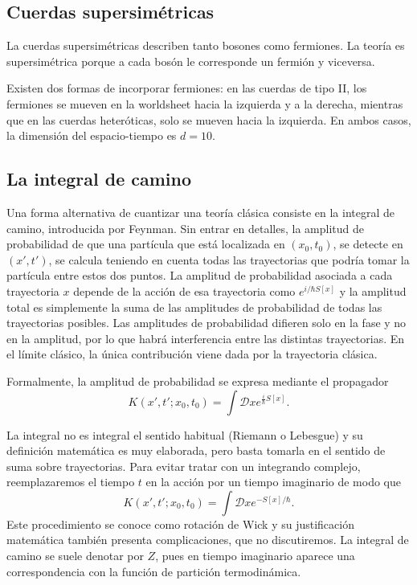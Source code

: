 \subsection{Cuerdas supersimétricas}

La cuerdas supersimétricas describen tanto bosones como fermiones.
La teoría es supersimétrica porque a cada bosón le corresponde un fermión y viceversa.

Existen dos formas de incorporar fermiones:
en las cuerdas de tipo II, los fermiones se mueven en la worldsheet hacia la izquierda y a la derecha,
mientras que en las cuerdas heteróticas, solo se mueven hacia la izquierda.
En ambos casos, la dimensión del espacio-tiempo es $d=10$.


\subsection{La integral de camino}

Una forma alternativa de cuantizar una teoría clásica consiste en la integral de camino, 
introducida por Feynman. 
Sin entrar en detalles, la amplitud de probabilidad de que una partícula que está localizada 
en $(x_0,t_0)$, se detecte en $(x',t')$, se calcula teniendo en cuenta todas las trayectorias
que podría tomar la partícula entre estos dos puntos.
La amplitud de probabilidad asociada a cada trayectoria $x$ depende de la acción de esa trayectoria
como $e^{i/\hbar S[x]}$ y la amplitud total es simplemente la suma de las amplitudes de probabilidad
de todas las trayectorias posibles.
Las amplitudes de probabilidad difieren solo en la fase y no en la amplitud, por lo que habrá 
interferencia entre las distintas trayectorias.
En el límite clásico, la única contribución viene dada por la trayectoria clásica.

Formalmente, la amplitud de probabilidad se expresa mediante el propagador
\begin{equation}
  K(x',t';x_0,t_0) = \int \mathcal Dx e^{\frac{i}{\hbar} S[x]}.
\end{equation}

La integral no es integral el sentido habitual (Riemann o Lebesgue) y su definición matemática
es muy elaborada, pero basta tomarla en el sentido de suma sobre trayectorias.
Para evitar tratar con un integrando complejo, reemplazaremos el tiempo $t$ en la acción por un tiempo imaginario de modo que
\begin{equation}
  K(x',t';x_0,t_0) = \int \mathcal Dx e^{- S[x]/ \hbar}.
\end{equation}
Este procedimiento se conoce como rotación de Wick y su justificación matemática también presenta complicaciones, 
que no discutiremos.
La integral de camino se suele denotar por $Z$, pues en tiempo imaginario aparece una correspondencia
con la función de partición termodinámica.

